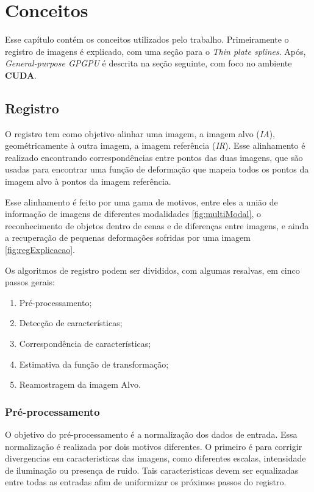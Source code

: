 \chapter{Conceitos}
\label{cap:conceitos}

  Esse capítulo contém os conceitos utilizados pelo trabalho. Primeiramente o
registro de imagens é explicado, com uma seção para o \textit{Thin plate splines}.
Após, \textit{General-purpose GPGPU} é descrita na seção seguinte, com foco
no ambiente \textbf{CUDA}.

\section{Registro}
\label{sec:fundamentos}

  O registro tem como objetivo alinhar uma imagem, a imagem alvo (\textit{IA}),
geométricamente à outra imagem, a imagem referência (\textit{IR}). Esse
alinhamento é realizado encontrando correspondências entre pontos das duas imagens,
que são usadas para encontrar uma função de deformação que mapeia todos os
pontos da imagem alvo à pontos da imagem referência.

  Esse alinhamento é feito por uma gama de motivos, entre eles a união de informação
de imagens de diferentes modalidades \ref{fig:multiModal}, o reconhecimento de
objetos dentro de cenas e de diferenças entre imagens, e ainda a recuperação de
pequenas deformações sofridas por uma imagem \ref{fig:regExplicacao}.

Os algoritmos de registro podem ser divididos, com algumas resalvas, em cinco
passos gerais:
\begin{enumerate}
    \item Pré-processamento;
    \item Detecção de características;
    \item Correspondência de características;
    \item Estimativa da função de transformação;
    \item Reamostragem da imagem Alvo.
\end{enumerate} %

\subsection{Pré-processamento}
  O objetivo do pré-processamento é a normalização dos dados de entrada. Essa
normalização é realizada por dois motivos diferentes. O primeiro é para corrigir
divergencias em caracteristicas das imagens, como diferentes escalas, intensidade
de iluminação ou presença de ruido. Tais caracteristicas devem ser equalizadas
entre todas as entradas afim de uniformizar os próximos passos do registro.

